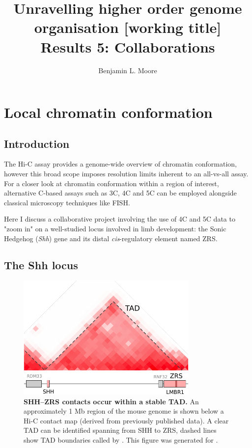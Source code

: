 \documentclass[a4paper,11pt,oneside]{book}
\title{ \vspace{3in} Unravelling higher order genome organisation {\small [working
    title]} \\ \vspace{2em} {\large {\bf Results 5: Collaborations}} }
\author{Benjamin L. Moore}
\begin{document}

\chapter{Local chromatin conformation}\label{chap:shh}

\section{Introduction}

The Hi-C assay provides a genome-wide overview of chromatin conformation, however this broad scope imposes resolution limits inherent to an all-vs-all assay. For a closer look at chromatin conformation within a region of interest, alternative C-based assays such as 3C, 4C and 5C can be employed alongside classical microscopy techniques like FISH.

Here I discuss a collaborative project involving the use of 4C and 5C data to "zoom in" on a well-studied locus involved in limb development: the Sonic Hedgehog (\emph{Shh}) gene and its distal \emph{cis}-regulatory element named ZRS.

\section{The Shh locus}

\begin{figure}
\begin{center} 
\includegraphics[width=3.5in]{figs/shhtad.pdf}
\captionsetup{width=\textwidth} 
\caption[SHH--ZRS contacts occur within a stable TAD.]{ {\bf SHH--ZRS contacts occur within a stable TAD. }
An approximately 1 Mb region of the mouse genome is shown below a Hi-C contact map (derived from previously published data\cite{Dixon2012}). A clear TAD can be identified spanning from SHH to ZRS, dashed lines show TAD boundaries called by \citet{Dixon2012}. This figure was generated for \citet{Anderson2014a}.
}\label{fig:shhtad}
\end{center} 
\end{figure} 
\end{document}
